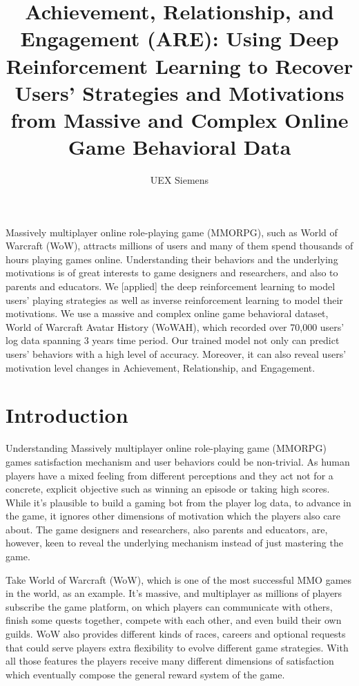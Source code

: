 \documentclass[a4paper]{article}
\title{Achievement, Relationship, and Engagement (ARE): Using Deep Reinforcement Learning to Recover Users' Strategies and Motivations from Massive and Complex Online Game Behavioral Data}
\author{UEX Siemens}
\begin{document}
\maketitle

\abstract

Massively multiplayer online role-playing game (MMORPG), such as World of Warcraft (WoW), attracts millions of users and many of them spend thousands of hours playing games online. Understanding their behaviors and the underlying motivations is of great interests to game designers and researchers, and also to parents and educators. We [applied] the deep reinforcement learning to model users' playing strategies as well as inverse reinforcement learning to model their motivations. We use a massive and complex online game behavioral dataset, World of Warcraft Avatar History (WoWAH), which recorded over 70,000 users' log data spanning 3 years time period. Our trained model not only can predict users' behaviors with a high level of accuracy. Moreover, it can also reveal users' motivation level changes in Achievement, Relationship, and Engagement. 

\section{Introduction}

Understanding Massively multiplayer online role-playing game (MMORPG) games satisfaction mechanism and user behaviors could be non-trivial. As human players have a mixed feeling from different perceptions and they act not for a concrete, explicit objective such as winning an episode or taking high scores. While it's plausible to build a gaming bot from the player log data, to advance in the game, it ignores other dimensions of motivation which the players also care about. The game designers and researchers, also parents and educators, are, however, keen to reveal the underlying mechanism instead of just mastering the game.

Take World of Warcraft (WoW), which is one of the most successful MMO games in the world, as an example. It's massive, and multiplayer as millions of players subscribe the game platform, on which players can communicate with others, finish some quests together, compete with each other, and even build their own guilds. WoW also provides different kinds of races, careers and optional requests that could serve players extra flexibility to evolve different game strategies. With all those features the players receive many different dimensions of satisfaction which eventually compose the general reward system of the game.
\end{document}
